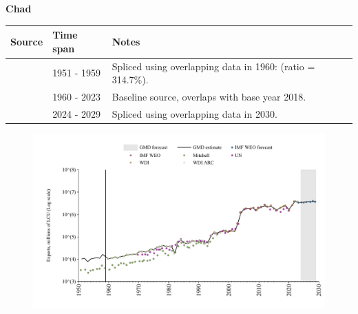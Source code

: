 \documentclass[12pt,a4paper,landscape]{article}
\begin{document}
\begin{adjustbox}{max totalsize={\paperwidth}{\paperheight},center}
\begin{minipage}[t][\textheight][t]{\textwidth}
\vspace*{0.5cm}
{}
\begin{center}
{\Large\bfseries Chad}
\end{center}
\vspace{0.5cm}
\begin{table}[H]
\centering
\small
\begin{tabular}{|l|l|l|}
\hline
\textbf{Source} & \textbf{Time span} & \textbf{Notes} \\
\hline
\rowcolor{white}\cite{Mitchell}& 1951 - 1959 &Spliced using overlapping data in 1960: (ratio = 314.7\%).\\
\rowcolor{lightgray}\cite{WDI}& 1960 - 2023 &Baseline source, overlaps with base year 2018.\\
\rowcolor{white}\cite{IMF_WEO_forecast}& 2024 - 2029 &Spliced using overlapping data in 2030.\\
\hline
\end{tabular}
\end{table}
\begin{figure}[H]
\centering
\includegraphics[width=\textwidth,height=0.6\textheight,keepaspectratio]{graphs/TCD_exports.pdf}
\end{figure}
\end{minipage}
\end{adjustbox}
\end{document}
